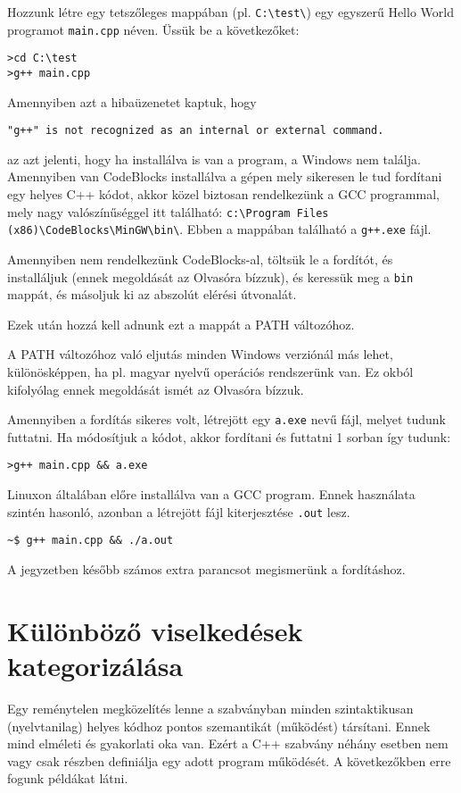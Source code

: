 \documentclass[a4paper,11.5pt,table]{article}
\begin{document}
	Hozzunk létre egy tetszőleges mappában (pl. \texttt{C:\textbackslash test\textbackslash}) egy egyszerű Hello World programot \texttt{main.cpp} néven. Üssük be a következőket:
	\begin{lstlisting}
>cd C:\test
>g++ main.cpp
	\end{lstlisting}
	Amennyiben azt a hibaüzenetet kaptuk, hogy 
	
	{\centering\texttt{"g++" is not recognized as an internal or external command.}\par}
	
	az azt jelenti, hogy ha installálva is van a program, a Windows nem találja. Amennyiben van CodeBlocks installálva a gépen mely sikeresen le tud fordítani egy helyes C++ kódot, akkor közel biztosan rendelkezünk a GCC programmal, mely nagy valószínűséggel itt található: \texttt{c:\textbackslash Program Files (x86)\textbackslash CodeBlocks\textbackslash MinGW\textbackslash bin\textbackslash }. Ebben a mappában található a \texttt{g++.exe} fájl.
	 
	Amennyiben nem rendelkezünk CodeBlocks-al, töltsük le a fordítót, és installáljuk (ennek megoldását az Olvasóra bízzuk), és keressük meg a \texttt{bin} mappát, és másoljuk ki az abszolút elérési útvonalát.
	 
	Ezek után hozzá kell adnunk ezt a mappát a PATH változóhoz.
	\begin{note}
	 	A PATH változóhoz való eljutás minden Windows verziónál más lehet, különösképpen, ha pl. magyar nyelvű operációs rendszerünk van. Ez okból kifolyólag ennek megoldását ismét az Olvasóra bízzuk.
	\end{note}
	Amennyiben a fordítás sikeres volt, létrejött egy \texttt{a.exe} nevű fájl, melyet tudunk futtatni. Ha módosítjuk a kódot, akkor fordítani és futtatni 1 sorban így tudunk:
	\begin{lstlisting}
>g++ main.cpp && a.exe
	\end{lstlisting}
	Linuxon általában előre installálva van a GCC program. Ennek használata szintén hasonló, azonban a létrejött fájl kiterjesztése \texttt{.out} lesz.
	\begin{lstlisting}
~$ g++ main.cpp && ./a.out
	\end{lstlisting}
	A jegyzetben később számos extra parancsot megismerünk a fordításhoz.
	\section{Különböző viselkedések kategorizálása}
	Egy reménytelen megközelítés lenne a szabványban minden szintaktikusan (nyelvtanilag) helyes kódhoz pontos szemantikát (működést) társítani. Ennek mind elméleti és gyakorlati oka van. Ezért a C++ szabvány néhány esetben nem vagy csak részben definiálja egy adott program működését. A következőkben erre fogunk példákat látni.
\end{document}
